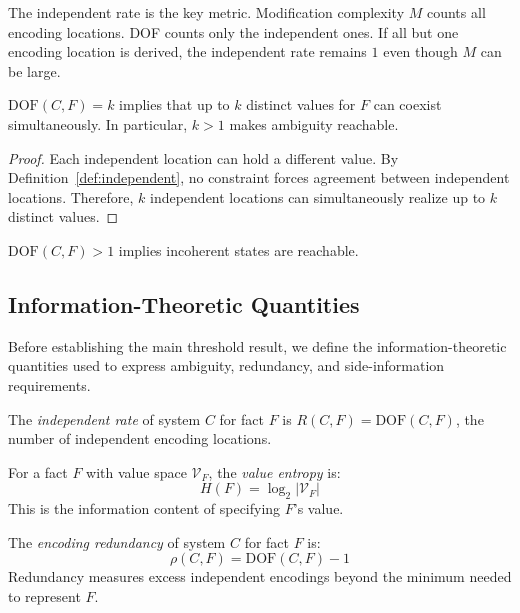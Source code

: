 The independent rate is the key metric. Modification complexity $M$ counts all encoding locations. DOF counts only the independent ones. If all but one encoding location is derived, the independent rate remains $1$ even though $M$ can be large.

\begin{theorem}[DOF = Incoherence Potential]\label{thm:dof-inconsistency}
$\text{DOF}(C, F) = k$ implies that up to $k$ distinct values for $F$ can coexist simultaneously. In particular, $k>1$ makes ambiguity reachable.
\end{theorem}

\begin{proof}
Each independent location can hold a different value. By Definition~\ref{def:independent}, no constraint forces agreement between independent locations. Therefore, $k$ independent locations can simultaneously realize up to $k$ distinct values.
\end{proof}

\begin{corollary}\label{cor:dof-risk}
$\text{DOF}(C, F) > 1$ implies incoherent states are reachable.
\end{corollary}

\subsection{Information-Theoretic Quantities}\label{sec:it-quantities}

Before establishing the main threshold result, we define the information-theoretic quantities used to express ambiguity, redundancy, and side-information requirements.

\begin{definition}\label{def:encoding-rate}
The \emph{independent rate} of system $C$ for fact $F$ is $R(C, F) = \text{DOF}(C, F)$, the number of independent encoding locations.
\end{definition}

\begin{definition}\label{def:value-entropy}
For a fact $F$ with value space $\mathcal{V}_F$, the \emph{value entropy} is:
\[
H(F) = \log_2 |\mathcal{V}_F|
\]
This is the information content of specifying $F$'s value.
\end{definition}

\begin{definition}\label{def:redundancy}
The \emph{encoding redundancy} of system $C$ for fact $F$ is:
\[
\rho(C, F) = \text{DOF}(C, F) - 1
\]
Redundancy measures excess independent encodings beyond the minimum needed to represent $F$.
\end{definition}

